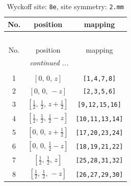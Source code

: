 \documentclass[fleqn,8pt]{jsarticle}
\begin{document}
\renewcommand{\arraystretch}{1.2}
\begin{longtable}{ccc}
\caption{Wyckoff site: {\tt 8e}, site symmetry: {\tt 2.mm}}
 \\
 \hline \hline
No. & position & mapping \\ \hline \endfirsthead

\multicolumn{2}{l}{\tablename\ \thetable{}} \\
 \hline \hline
No. & position & mapping \\ \hline \endhead

 \hline \hline
\multicolumn{2}{r}{\footnotesize\it continued ...} \\ \endfoot

 \hline \hline
\multicolumn{2}{r}{} \\ \endlastfoot

1 & $\left[ 0,\, 0,\, z \right]$ & {\tt [1,4,7,8]} \\ \hline
2 & $\left[ 0,\, 0,\, - z \right]$ & {\tt [2,3,5,6]} \\ \hline
3 & $\left[ \frac{1}{2},\, \frac{1}{2},\, z + \frac{1}{2} \right]$ & {\tt [9,12,15,16]} \\ \hline
4 & $\left[ \frac{1}{2},\, \frac{1}{2},\, \frac{1}{2} - z \right]$ & {\tt [10,11,13,14]} \\ \hline
5 & $\left[ 0,\, 0,\, z + \frac{1}{2} \right]$ & {\tt [17,20,23,24]} \\ \hline
6 & $\left[ 0,\, 0,\, \frac{1}{2} - z \right]$ & {\tt [18,19,21,22]} \\ \hline
7 & $\left[ \frac{1}{2},\, \frac{1}{2},\, z \right]$ & {\tt [25,28,31,32]} \\ \hline
8 & $\left[ \frac{1}{2},\, \frac{1}{2},\, - z \right]$ & {\tt [26,27,29,30]} \\
\end{longtable}
\renewcommand{\arraystretch}{1.2}
\end{document}
